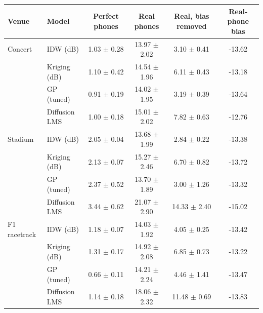 \begin{tabular}{llcccc}
\toprule
Venue & Model & Perfect phones & Real phones & Real, bias removed & Real-phone bias \\
\midrule
Concert & IDW (dB) & 1.03 $\pm$ 0.28 & 13.97 $\pm$ 2.02 & 3.10 $\pm$ 0.41 & -13.62 \\
 & Kriging (dB) & 1.10 $\pm$ 0.42 & 14.54 $\pm$ 1.96 & 6.11 $\pm$ 0.43 & -13.18 \\
 & GP (tuned) & 0.91 $\pm$ 0.19 & 14.02 $\pm$ 1.95 & 3.19 $\pm$ 0.39 & -13.64 \\
 & Diffusion LMS & 1.00 $\pm$ 0.18 & 15.01 $\pm$ 2.02 & 7.82 $\pm$ 0.63 & -12.76 \\
\midrule
Stadium & IDW (dB) & 2.05 $\pm$ 0.04 & 13.68 $\pm$ 1.99 & 2.84 $\pm$ 0.22 & -13.38 \\
 & Kriging (dB) & 2.13 $\pm$ 0.07 & 15.27 $\pm$ 2.46 & 6.70 $\pm$ 0.82 & -13.72 \\
 & GP (tuned) & 2.37 $\pm$ 0.52 & 13.70 $\pm$ 1.89 & 3.00 $\pm$ 1.26 & -13.32 \\
 & Diffusion LMS & 3.44 $\pm$ 0.62 & 21.07 $\pm$ 2.90 & 14.33 $\pm$ 2.40 & -15.02 \\
\midrule
F1 racetrack & IDW (dB) & 1.18 $\pm$ 0.07 & 14.03 $\pm$ 1.92 & 4.05 $\pm$ 0.25 & -13.42 \\
 & Kriging (dB) & 1.31 $\pm$ 0.17 & 14.92 $\pm$ 2.08 & 6.85 $\pm$ 0.73 & -13.22 \\
 & GP (tuned) & 0.66 $\pm$ 0.11 & 14.21 $\pm$ 2.24 & 4.46 $\pm$ 1.41 & -13.47 \\
 & Diffusion LMS & 1.14 $\pm$ 0.18 & 18.06 $\pm$ 2.32 & 11.48 $\pm$ 0.69 & -13.83 \\
\bottomrule
\end{tabular}
